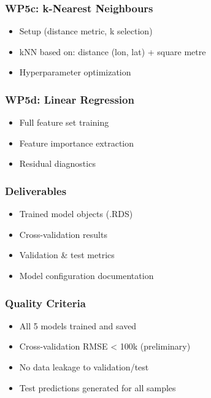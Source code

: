 \documentclass[
  english,
  letterpaper,
  DIV=11,
  numbers=noendperiod]{scrreprt}
\providecommand{\tightlist}{%
  \setlength{\itemsep}{0pt}\setlength{\parskip}{0pt}}
\begin{document}
\subsubsection{WP5c: k-Nearest
Neighbours}\label{wp5c-k-nearest-neighbours}

\begin{itemize}
\tightlist
\item
  Setup (distance metric, k selection)
\item
  kNN based on: distance (lon, lat) + square metre
\item
  Hyperparameter optimization
\end{itemize}

\subsubsection{WP5d: Linear Regression}\label{wp5d-linear-regression}

\begin{itemize}
\tightlist
\item
  Full feature set training
\item
  Feature importance extraction
\item
  Residual diagnostics
\end{itemize}

\subsubsection{Deliverables}\label{deliverables-5}

\begin{itemize}
\tightlist
\item
  Trained model objects (.RDS)
\item
  Cross-validation results
\item
  Validation \& test metrics
\item
  Model configuration documentation
\end{itemize}

\subsubsection{Quality Criteria}\label{quality-criteria-4}

\begin{itemize}
\tightlist
\item[$\square$]
  All 5 models trained and saved
\item[$\square$]
  Cross-validation RMSE \textless{} 100k (preliminary)
\item[$\square$]
  No data leakage to validation/test
\item[$\square$]
  Test predictions generated for all samples
\end{itemize}
\end{document}

